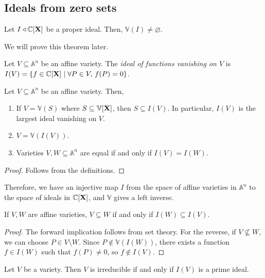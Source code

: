 \subsection{Ideals from zero sets}
\begin{theorem}
    Let \( I \triangleleft \mathbb C[\vb X] \) be a proper ideal.
    Then, \( \mathbb V(I) \neq \varnothing \).
\end{theorem}
We will prove this theorem later.
\begin{definition}
    Let \( V \subseteq \mathbb A^n \) be an affine variety.
    The \emph{ideal of functions vanishing on \( V \)} is \( I(V) = \qty{f \in \mathbb C[\vb X] \mid \forall P \in V,\, f(P) = 0} \).
\end{definition}
\begin{proposition}
    Let \( V \subseteq \mathbb A^n \) be an affine variety.
    Then,
    \begin{enumerate}
        \item If \( V = \mathbb V(S) \) where \( S \subseteq \mathbb V[\vb X] \), then \( S \subseteq I(V) \).
        In particular, \( I(V) \) is the largest ideal vanishing on \( V \).
        \item \( V = \mathbb V(I(V)) \).
        \item Varieties \( V, W \subseteq \mathbb A^n \) are equal if and only if \( I(V) = I(W) \).
    \end{enumerate}
\end{proposition}
\begin{proof}
    Follows from the definitions.
\end{proof}
Therefore, we have an injective map \( I \) from the space of affine varieties in \( \mathbb A^n \) to the space of ideals in \( \mathbb C[\vb X] \), and \( \mathbb V \) gives a left inverse.
\begin{proposition}
    If \( V, W \) are affine varieties, \( V \subseteq W \) if and only if \( I(W) \subseteq I(V) \).
\end{proposition}
\begin{proof}
    The forward implication follows from set theory.
    For the reverse, if \( V \not\subseteq W \), we can choose \( P \in V \setminus W \).
    Since \( P \not\in \mathbb V(I(W)) \), there exists a function \( f \in I(W) \) such that \( f(P) \neq 0 \), so \( f \not\in I(V) \).
\end{proof}
\begin{proposition}
    Let \( V \) be a variety.
    Then \( V \) is irreducible if and only if \( I(V) \) is a prime ideal.
\end{proposition}
